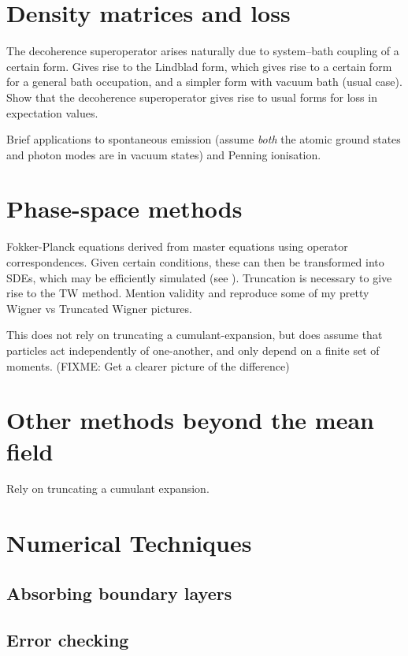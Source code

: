 \section{Density matrices and loss}
The decoherence superoperator arises naturally due to system--bath coupling of a certain form.  Gives rise to the Lindblad form, which gives rise to a certain form for a general bath occupation, and a simpler form with vacuum bath (usual case).  Show that the decoherence superoperator gives rise to usual forms for loss in expectation values.

Brief applications to spontaneous emission (assume \emph{both} the atomic ground states and photon modes are in vacuum states) and Penning ionisation.

\section{Phase-space methods}

Fokker-Planck equations derived from master equations using operator correspondences.  Given certain conditions, these can then be transformed into SDEs, which may be efficiently simulated (see ).  Truncation is necessary to give rise to the TW method.  Mention validity and reproduce some of my pretty Wigner vs Truncated Wigner pictures.  

This does not rely on truncating a cumulant-expansion, but does assume that particles act independently of one-another, and only depend on a finite set of moments. (FIXME: Get a clearer picture of the difference)

\section{Other methods beyond the mean field}

Rely on truncating a cumulant expansion.

\section{Numerical Techniques}
\label{BackgroundTheory:NumericalTechniques}
\subsection{Absorbing boundary layers}
\subsection{Error checking}
